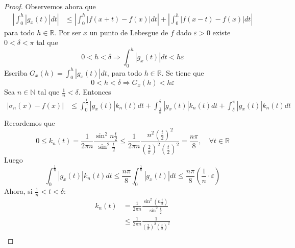 \documentclass[12pt]{report}
\newcounter{it}
\theoremstyle{largebreak}
\renewcommand{\leq}{\ensuremath{\leqslant}}
\newcommand\abs[1]{\ensuremath{\left|#1\right|}}
\begin{document}
\begin{proof}
        Observemos ahora que
        \begin{equation*}
            \begin{split}
                \abs{\int_0^{h}\abs{g_x(t)}dt}&\leq\abs{\int_0^h\abs{f(x+t)-f(x)}dt}+\abs{\int_0^h\abs{f(x-t)-f(x)}dt}
            \end{split}
        \end{equation*}
        para todo $h\in\mathbb{R}$. Por ser $x$ un punto de Lebesgue de $f$ dado $\varepsilon>0$ existe $0<\delta<\pi$ tal que
        \begin{equation*}
            0<h<\delta\Rightarrow\int_0^{h}\abs{g_x(t)}dt<h\varepsilon
        \end{equation*}
        Escriba $G_x(h)=\int_0^h \abs{g_x(t)}dt$, para todo $h\in\mathbb{R}$. Se tiene que
        \begin{equation*}
            0<h<\delta\Rightarrow G_x(h)<h\varepsilon
        \end{equation*}
        Sea $n\in\mathbb{N}$ tal que $\frac{1}{n}<\delta$. Entonces
        \begin{equation*}
            \begin{split}
                \abs{\sigma_n(x)-f(x)}&\leq\int_0^{\frac{1}{n}}\abs{g_x(t)}k_n(t)dt+\int_{\frac{1}{n}}^\delta\abs{g_x(t)}k_n(t)dt+\int_\delta^{\pi}\abs{g_x(t)}k_n(t)dt\\
            \end{split}
        \end{equation*}
        Recordemos que
        \begin{equation*}
            0\leq k_n(t)=\frac{1}{2\pi n}\frac{\sin^2 n\frac{t}{2}}{\sin^2\frac{t}{2}}\leq\frac{1}{2\pi n}\frac{n^2\left( \frac{t}{2}\right)^2}{\left(\frac{2}{\pi} \right)^2\left(\frac{t}{2} \right)^2}=\frac{n\pi}{8},\quad\forall t\in\mathbb{R}
        \end{equation*}
        Luego
        \begin{equation*}
            \int_0^{\frac{1}{n}}\abs{g_x(t)}k_n(t)dt\leq\frac{n\pi}{8}\int_0^{\frac{1}{n}}\abs{g_x(t)}dt\leq\frac{n\pi}{8}\left(\frac{1}{n}\cdot\varepsilon \right)
        \end{equation*}
        Ahora, si $\frac{1}{n}<t<\delta$:
        \begin{equation*}
            \begin{split}
                k_n(t)&=\frac{1}{2\pi n}\frac{\sin^2\left(n\frac{t}{2} \right)}{\sin^2\frac{t}{2}}\\
                &\leq\frac{1}{2\pi n}\frac{1}{\left(\frac{2}{\pi} \right)^2 \left(\frac{t}{2} \right)^2}\\

\end{split}
\end{equation*}
\end{proof}
\end{document}
